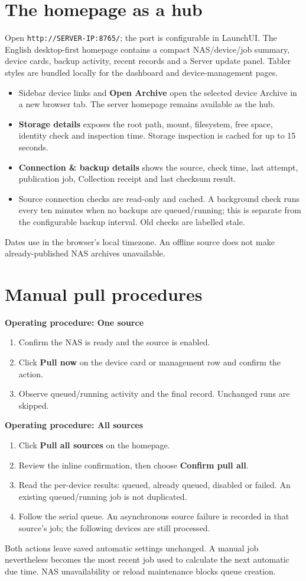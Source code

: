 \documentclass[11pt,oneside,openany]{book}
\newcommand{\code}[1]{\texttt{\detokenize{#1}}}
\newcommand{\pathcode}[1]{\nolinkurl{#1}}
\newcommand{\ui}[1]{\textbf{#1}}
\newenvironment{procedure}[1]{\par\medskip\noindent\textbf{Operating procedure: #1}\par\smallskip\begin{enumerate}}{\end{enumerate}\medskip}
\begin{document}
\section{The homepage as a hub}
Open \pathcode{http://SERVER-IP:8765/}; the port is configurable in LaunchUI.
The English desktop-first homepage contains a compact NAS/device/job summary,
device cards, backup activity, recent records and a Server update panel. Tabler
styles are bundled locally for the dashboard and device-management pages.
\begin{itemize}
\item Sidebar device links and \ui{Open Archive} open the selected device Archive in
a new browser tab. The server homepage remains available as the hub.
\item \ui{Storage details} exposes the root path, mount, filesystem, free space,
identity check and inspection time. Storage inspection is cached for up to 15 seconds.
\item \ui{Connection \& backup details} shows the source, check time, last attempt,
publication job, Collection receipt and last checksum result.
\item Source connection checks are read-only and cached. A background check runs
every ten minutes when no backups are queued/running; this is separate from the
configurable backup interval. Old checks are labelled stale.
\end{itemize}
Dates use \code{dd/mm/yy HH:mm} in the browser's local timezone. An offline source
does not make already-published NAS archives unavailable.

\section{Manual pull procedures}
\begin{procedure}{One source}
\item Confirm the NAS is ready and the source is enabled.
\item Click \ui{Pull now} on the device card or management row and confirm the action.
\item Observe queued/running activity and the final record. Unchanged runs are skipped.
\end{procedure}
\begin{procedure}{All sources}
\item Click \ui{Pull all sources} on the homepage.
\item Review the inline confirmation, then choose \ui{Confirm pull all}.
\item Read the per-device results: queued, already queued, disabled or failed.
An existing queued/running job is not duplicated.
\item Follow the serial queue. An asynchronous source failure is recorded in that
source's job; the following devices are still processed.
\end{procedure}
Both actions leave saved automatic settings unchanged. A manual job nevertheless
becomes the most recent job used to calculate the next automatic due time.
NAS unavailability or reload maintenance blocks queue creation.
\end{document}
